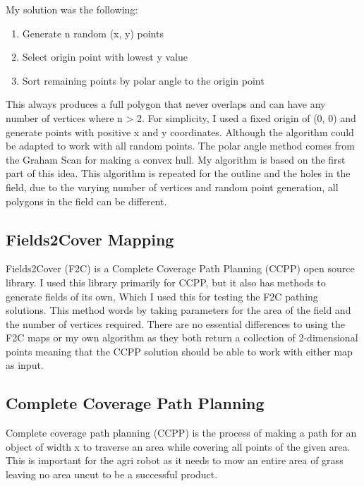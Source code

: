 \documentclass[progress]{cmpreport}
\begin{document}
My solution was the following:
\begin{enumerate}
	\item{Generate n random (x, y) points}
	\item{Select origin point with lowest y value}
	\item{Sort remaining points by polar angle to the origin point}
\end{enumerate}
This always produces a full polygon that never overlaps and can have any number of vertices where n > 2.
For simplicity, I used a fixed origin of (0, 0) and generate points with positive x and y coordinates. Although the algorithm could be adapted to work with all random points.
The polar angle method comes from the Graham Scan for making a convex hull. My algorithm is based on the first part of this idea.
This algorithm is repeated for the outline and the holes in the field, due to the varying number of vertices and random point generation, all polygons in the field can be different.

\subsection{Fields2Cover Mapping}
Fields2Cover (F2C) is a Complete Coverage Path Planning (CCPP) open source library. I used this library primarily for CCPP, but it also has methods to generate fields of its own,
Which I used this for testing the F2C pathing solutions.
This method words by taking parameters for the area of the field and the number of vertices required.
There are no essential differences to using the F2C maps or my own algorithm as they both return a collection of 2-dimensional points meaning that the CCPP solution should be able to work with either map as input.

\subsection{Complete Coverage Path Planning}
Complete coverage path planning (CCPP) is the process of making a path for an object of width x to traverse an area while covering all points of the given area.
This is important for the agri robot as it needs to mow an entire area of grass leaving no area uncut to be a successful product.






\end{document}
